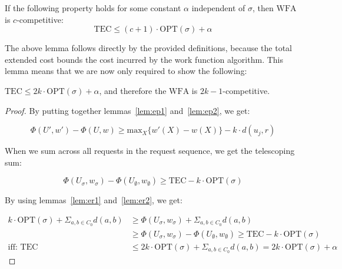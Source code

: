 \begin{lemma}
    If the following property holds for some constant $\alpha$ independent of $\sigma$, then $\mathrm{WFA}$ is $c$-competitive:
    \begin{equation*}
        \mathrm{TEC} \leq (c+1) \cdot  \mathrm{OPT}(\sigma) + \alpha
    \end{equation*}
\end{lemma}

The above lemma follows directly by the provided definitions, because the total extended cost bounds the cost incurred by the work function algorithm. This lemma means that we are now only required to show the following:

\begin{lemma}
    $\mathrm{TEC} \leq 2k \cdot  \mathrm{OPT}(\sigma) + \alpha$, and therefore the $\mathrm{WFA}$ is $2k-1$-competitive.
\end{lemma}

\begin{proof}
    By putting together lemmas~\ref{lem:ep1} and~\ref{lem:ep2}, we get:

    \begin{equation*}
        \Phi(U', w') - \Phi(U, w) \geq \mathrm{max}_X\{ w'(X) - w(X)\} -k \cdot  d(u_j, r)
    \end{equation*}

    When we sum across all requests in the request sequence, we get the telescoping sum:

    \begin{equation*}
        \Phi(U_\sigma, w_\sigma) - \Phi(U_\emptyset, w_\emptyset) \geq \mathrm{TEC} - k\cdot \mathrm{OPT}(\sigma)
    \end{equation*}

    By using lemmas~\ref{lem:er1} and~\ref{lem:er2}, we get:

    \begin{equation*}
        \begin{split}
            k \cdot  \mathrm{OPT}(\sigma)+ \Sigma_{a, b \in C_0} d(a, b) &\geq \Phi(U_\sigma, w_\sigma) + \Sigma_{a, b \in C_0} d(a, b) \\
            &\geq \Phi(U_\sigma, w_\sigma) - \Phi(U_\emptyset, w_\emptyset) \geq \mathrm{TEC} - k\cdot \mathrm{OPT}(\sigma)\\
            \text{iff: }\mathrm{TEC} &\leq 2k \cdot  \mathrm{OPT}(\sigma) + \Sigma_{a, b \in C_0} d(a, b) = 2k \cdot \mathrm{OPT}(\sigma) + \alpha
        \end{split}
    \end{equation*}
\end{proof}




